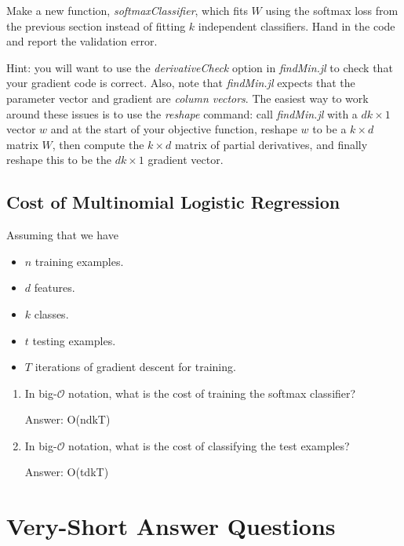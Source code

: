 \documentclass{article}
\def\ans#1{\par\gre{Answer: #1}}
\def\blu#1{{\color{blu}#1}}
\def\gre#1{{\color{gre}#1}}
\def\items#1{\begin{itemize}#1\end{itemize}}
\def\enum#1{\begin{enumerate}#1\end{enumerate}}
\begin{document}
Make a new function, \emph{softmaxClassifier}, which fits $W$ using the softmax loss from the previous section  instead of fitting $k$ independent classifiers. \blu{Hand in the code and report the validation error}.

Hint: you will want to use the \emph{derivativeCheck} option in \emph{findMin.jl} to check that your gradient code is correct. Also, note that \emph{findMin.jl} expects that the parameter vector and gradient are \emph{column vectors}. The easiest way to work around these issues is to use the \emph{reshape} command: call \emph{findMin.jl} with a $dk \times 1$ vector $w$ and at the start of your objective function, reshape $w$ to be a $k \times d$ matrix $W$, then compute the $k \times d$ matrix of partial derivatives, and finally reshape this to be the $dk \times 1$ gradient vector.

\pagebreak

\subsection{Cost of Multinomial Logistic Regression}

Assuming that we have
\items{
\item $n$ training examples.
\item $d$ features.
\item $k$ classes.
\item $t$ testing examples.
\item $T$ iterations of gradient descent for training.
}
\blu{\enum{
\item In big-$\mathcal{O}$ notation, what is the cost of training the softmax classifier?
\ans{O(ndkT)}
\item In big-$\mathcal{O}$ notation, what is the cost of classifying the test examples?
\ans{O(tdkT)}
}}

\pagebreak

\section{Very-Short Answer Questions}
\end{document}
